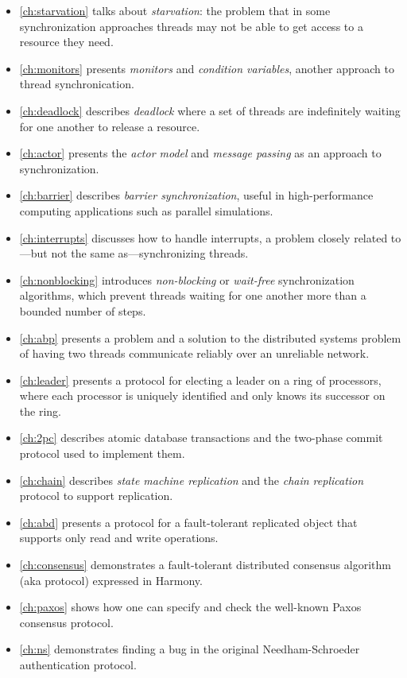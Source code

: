 \documentclass{report}
\begin{document}
\begin{itemize}

\item \autoref{ch:starvation} talks about \emph{starvation}:
the problem that in some
synchronization approaches threads may not be able to get access to a
resource they need.
\item \autoref{ch:monitors} presents
\emph{monitors} and \emph{condition variables},
another approach to thread synchronication.
\item \autoref{ch:deadlock} describes \emph{deadlock}
where a set of threads are indefinitely waiting for one another to
release a resource.
\item \autoref{ch:actor} presents the \emph{actor model}
and \emph{message passing} as an approach to synchronization.
\item \autoref{ch:barrier} describes \emph{barrier synchronization},
useful in high-performance computing applications such as parallel simulations.
\item \autoref{ch:interrupts} discusses how to handle interrupts,
a problem closely related to---but not the same as---synchronizing threads.
\item \autoref{ch:nonblocking} introduces \emph{non-blocking} or
\emph{wait-free} synchronization algorithms,
which prevent threads waiting for one another more than a bounded number of
steps.
\item \autoref{ch:abp} presents a problem and a solution to the distributed
systems problem of having two threads communicate reliably over an unreliable
network.
\item \autoref{ch:leader} presents a protocol for electing a leader on
a ring of processors, where each processor is uniquely identified and 
only knows its successor on the ring.
\item \autoref{ch:2pc} describes atomic database transactions and the two-phase commit protocol used to implement them.
\item \autoref{ch:chain} describes \emph{state machine replication} and
the \emph{chain replication} protocol to support replication.
\item \autoref{ch:abd} presents a protocol for a fault-tolerant
replicated object that supports only read and write operations.
\item \autoref{ch:consensus} demonstrates a fault-tolerant distributed consensus
algorithm (aka protocol) expressed in Harmony.
\item \autoref{ch:paxos} shows how one can specify and check the well-known
Paxos consensus protocol.
\item \autoref{ch:ns} demonstrates finding a bug in the original Needham-Schroeder
authentication protocol.
\end{itemize}
\end{document}
